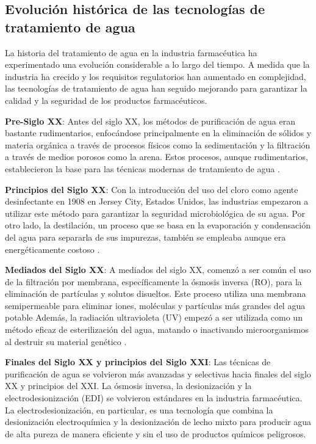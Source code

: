 \subsection{Evolución histórica de las tecnologías de tratamiento de agua}

La historia del tratamiento de agua en la industria farmacéutica ha experimentado una evolución considerable a lo largo del tiempo. A medida que la industria ha crecido y los requisitos regulatorios han aumentado en complejidad, las tecnologías de tratamiento de agua han seguido mejorando para garantizar la calidad y la seguridad de los productos farmacéuticos.

\textbf{Pre-Siglo XX}: Antes del siglo XX, los métodos de purificación de agua eran bastante rudimentarios,
enfocándose principalmente en la eliminación de sólidos y materia orgánica a través de procesos físicos como
la sedimentación y la filtración a través de medios porosos como la arena. Estos procesos, aunque rudimentarios,
establecieron la base para las técnicas modernas de tratamiento de agua \cite{higieneambientalHistoriaTratamientoAgua2018}.

\textbf{Principios del Siglo XX}: Con la introducción del uso del cloro como agente desinfectante en 1908 en Jersey City,
Estados Unidos, las industrias empezaron a utilizar este método para garantizar la seguridad microbiológica de su agua.
Por otro lado, la destilación, un proceso que se basa en la evaporación y condensación del agua para separarla de sus
impurezas, también se empleaba aunque era energéticamente costoso \cite{higieneambientalHistoriaTratamientoAgua2018}.

\textbf{Mediados del Siglo XX}: A mediados del siglo XX, comenzó a ser común el uso de la filtración por membrana,
específicamente la ósmosis inversa (RO), para la eliminación de partículas y solutos disueltos. Este proceso utiliza
una membrana semipermeable para eliminar iones, moléculas y partículas más grandes del agua potable Además,
la radiación ultravioleta (UV) empezó a ser utilizada como un método eficaz de esterilización del agua,
matando o inactivando microorganismos al destruir su material genético \cite{higieneambientalHistoriaTratamientoAgua2018}.

\textbf{Finales del Siglo XX y principios del Siglo XXI}: Las técnicas de purificación de agua se volvieron más avanzadas y selectivas hacia
finales del siglo XX y principios del XXI. La ósmosis inversa, la desionización y la electrodesionización (EDI)
se volvieron estándares en la industria farmacéutica. La electrodesionización, en particular, es una tecnología
que combina la desionización electroquímica y la desionización de lecho mixto para producir agua de alta pureza de
manera eficiente y sin el uso de productos químicos peligrosos.

